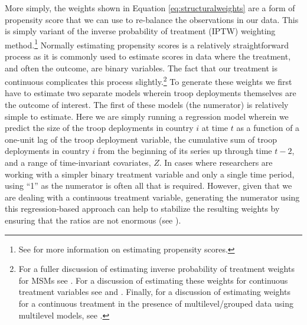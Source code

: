More simply, the weights shown in Equation \ref{eq:structuralweights} are a form of propensity score that we can use to re-balance the observations in our data. This is simply variant of the inverse probability of treatment (IPTW) weighting method.\footnote{See  for more information on estimating propensity scores.} Normally estimating propensity scores is a relatively straightforward process as it is commonly used to estimate scores in data where the treatment, and often the outcome, are binary variables. The fact that our treatment is continuous complicates this process slightly.\footnote{For a fuller discussion of estimating inverse probability of treatment weights for MSMs see . For a discussion of estimating these weights for continuous treatment variables see  and . Finally, for a discussion of estimating weights for a continuous treatment in the presence of multilevel/grouped data using multilevel models, see .} To generate these weights we first have to estimate two separate models wherein troop deployments themselves are the outcome of interest. The first of these models (the numerator) is relatively simple to estimate. Here we are simply running a regression model wherein we predict the size of the troop deployments in country $i$ at time $t$ as a function of a one-unit lag of the troop deployment variable, the cumulative sum of troop deployments in country $i$ from the beginning of its series up through time $t-2$, and a range of time-invariant covariates, $Z$. In cases where researchers are working with a simpler binary treatment variable and only a single time period, using ``1'' as the numerator is often all that is required. However, given that we are dealing with a continuous treatment variable, generating the numerator using this regression-based approach can help to stabilize the resulting weights by ensuring that the ratios are not enormous (see ).

